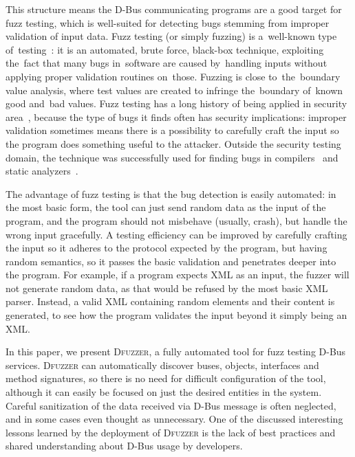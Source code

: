 \documentclass[conference]{IEEEtran}
\begin{document}
This structure means the D-Bus communicating programs are a good target for
fuzz testing, which is well-suited for detecting bugs stemming from improper
validation of input data. Fuzz testing (or simply fuzzing) is a~well-known type
of~testing~\cite{miller90-fuzz}: it is an automated, brute force, black-box
technique, exploiting the~fact that many bugs in~software are caused
by~handling inputs without applying proper validation routines on~those.
Fuzzing is close to~the~boundary value analysis, where test values are created
to infringe the~boundary of~known good and~bad values.  Fuzz testing has a long
history of being applied in security area~\cite{takanen08-book,sutton07-book},
because the type of bugs it finds often has security implications: improper
validation sometimes means there is a possibility to carefully craft the input
so the program does something useful to the attacker. Outside the security
testing domain, the technique was successfully used for finding bugs in
compilers~\cite{regehr11-compfuzz} and static analyzers~\cite{regehr12-safuzz}.

The advantage of fuzz testing is that the bug detection is easily automated: in
the most basic form, the tool can just send random data as the input of the
program, and the program should not misbehave (usually, crash), but handle the
wrong input gracefully. A testing efficiency can be improved by carefully
crafting the input so it adheres to the protocol expected by the program, but
having random semantics, so it passes the basic validation and penetrates deeper
into the program. For example, if a program expects XML as an input, the fuzzer
will not generate random data, as that would be refused by the most basic XML
parser. Instead, a valid XML containing random elements and their content is
generated, to see how the program validates the input beyond it simply being an
XML.

In this paper, we present \textsc{Dfuzzer}, a fully automated tool for fuzz
testing D-Bus services. \textsc{Dfuzzer} can automatically discover buses,
objects, interfaces and method signatures, so there is no need for difficult
configuration of the tool, although it can easily be focused on just the desired
entities in the system. Careful sanitization of the data received via D-Bus
message is often neglected, and in some cases even thought as unnecessary. One of
the discussed interesting lessons learned by the deployment of
\textsc{Dfuzzer} is the lack of best practices and shared understanding about
D-Bus usage by developers.
\end{document}
